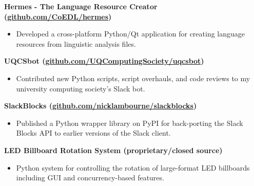 \documentclass[a4paper]{article}
\newenvironment{singleitem}
{   \small
    \vspace{0pt}
    \begin{itemize}
    \setlength{\itemsep}{0pt}
    \setlength{\parskip}{0pt}
    \setlength{\parsep}{0pt}   }
{\end{itemize} \vspace{1pt}	}
\begin{document}
\textbf{{Hermes - The Language Resource Creator} (\href{https://github.com/CoEDL/hermes}{github.com/CoEDL/hermes})}
\begin{singleitem}
	\item Developed a cross-platform Python/Qt application for creating language resources from linguistic analysis files.
\end{singleitem}


\textbf{UQCSbot (\href{https://github.com/UQComputingSociety/uqcsbot}{github.com/UQComputingSociety/uqcsbot})}
\begin{singleitem}
	\item Contributed new Python scripts, script overhauls, and code reviews to my university computing society's Slack bot.
\end{singleitem}

\textbf{SlackBlocks (\href{https://github.com/nicklambourne/slackblocks}{github.com/nicklambourne/slackblocks})}
\begin{singleitem}
	\item Published a Python wrapper library on PyPI for back-porting the Slack Blocks API to earlier versions of the Slack client.
\end{singleitem}

\textbf{LED Billboard Rotation System (proprietary/closed source)}
\begin{singleitem}
	\item Python system for controlling the rotation of large-format LED billboards including GUI and concurrency-based features.
\end{singleitem}

\vspace{1mm}
\end{document}
